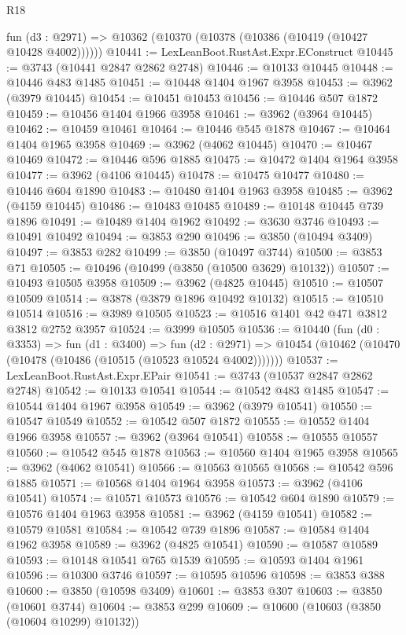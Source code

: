 \begin{lexlean}{R18}
\begin{coremodule}
    fun (d3 : @2971) => @10362 (@10370 (@10378 (@10386 (@10419 (@10427 @10428 @4002))))))
@10441 := LexLeanBoot.RustAst.Expr.EConstruct
@10445 := @3743 (@10441 @2847 @2862 @2748)
@10446 := @10133 @10445
@10448 := @10446 @483 @1485
@10451 := @10448 @1404 @1967 @3958
@10453 := @3962 (@3979 @10445)
@10454 := @10451 @10453
@10456 := @10446 @507 @1872
@10459 := @10456 @1404 @1966 @3958
@10461 := @3962 (@3964 @10445)
@10462 := @10459 @10461
@10464 := @10446 @545 @1878
@10467 := @10464 @1404 @1965 @3958
@10469 := @3962 (@4062 @10445)
@10470 := @10467 @10469
@10472 := @10446 @596 @1885
@10475 := @10472 @1404 @1964 @3958
@10477 := @3962 (@4106 @10445)
@10478 := @10475 @10477
@10480 := @10446 @604 @1890
@10483 := @10480 @1404 @1963 @3958
@10485 := @3962 (@4159 @10445)
@10486 := @10483 @10485
@10489 := @10148 @10445 @739 @1896
@10491 := @10489 @1404 @1962
@10492 := @3630 @3746
@10493 := @10491 @10492
@10494 := @3853 @290
@10496 := @3850 (@10494 @3409)
@10497 := @3853 @282
@10499 := @3850 (@10497 @3744)
@10500 := @3853 @71
@10505 := @10496 (@10499 (@3850 (@10500 @3629) @10132))
@10507 := @10493 @10505 @3958
@10509 := @3962 (@4825 @10445)
@10510 := @10507 @10509
@10514 := @3878 (@3879 @1896 @10492 @10132)
@10515 := @10510 @10514
@10516 := @3989 @10505
@10523 := @10516 @1401 @42 @471 @3812 @3812 @2752 @3957
@10524 := @3999 @10505
@10536 := @10440
    (fun (d0 : @3353) =>
    fun (d1 : @3400) =>
    fun (d2 : @2971) => @10454 (@10462 (@10470 (@10478 (@10486 (@10515 (@10523 @10524 @4002)))))))
@10537 := LexLeanBoot.RustAst.Expr.EPair
@10541 := @3743 (@10537 @2847 @2862 @2748)
@10542 := @10133 @10541
@10544 := @10542 @483 @1485
@10547 := @10544 @1404 @1967 @3958
@10549 := @3962 (@3979 @10541)
@10550 := @10547 @10549
@10552 := @10542 @507 @1872
@10555 := @10552 @1404 @1966 @3958
@10557 := @3962 (@3964 @10541)
@10558 := @10555 @10557
@10560 := @10542 @545 @1878
@10563 := @10560 @1404 @1965 @3958
@10565 := @3962 (@4062 @10541)
@10566 := @10563 @10565
@10568 := @10542 @596 @1885
@10571 := @10568 @1404 @1964 @3958
@10573 := @3962 (@4106 @10541)
@10574 := @10571 @10573
@10576 := @10542 @604 @1890
@10579 := @10576 @1404 @1963 @3958
@10581 := @3962 (@4159 @10541)
@10582 := @10579 @10581
@10584 := @10542 @739 @1896
@10587 := @10584 @1404 @1962 @3958
@10589 := @3962 (@4825 @10541)
@10590 := @10587 @10589
@10593 := @10148 @10541 @765 @1539
@10595 := @10593 @1404 @1961
@10596 := @10300 @3746
@10597 := @10595 @10596
@10598 := @3853 @388
@10600 := @3850 (@10598 @3409)
@10601 := @3853 @307
@10603 := @3850 (@10601 @3744)
@10604 := @3853 @299
@10609 := @10600 (@10603 (@3850 (@10604 @10299) @10132))

\end{coremodule}
\end{lexlean}
